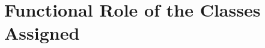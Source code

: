 \documentclass[../../dd.tex]{subfiles}
\begin{document}
	\chapter{Functional Role of the Classes Assigned}
\end{document}

